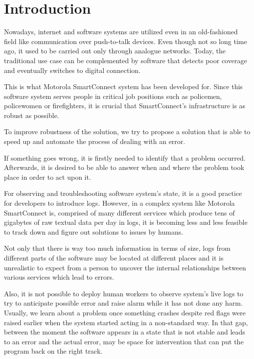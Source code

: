 
\chapter{Introduction}
\label{introduction}

Nowadays, internet and software systems are utilized even in an old-fashioned field like communication over push-to-talk devices. Even though not so long time ago, it used to be carried out only through analogue networks. Today, the traditional use case can be complemented by software that detects poor coverage and eventually switches to digital connection. 

This is what Motorola SmartConnect system has been developed for. 
Since this software system serves people in critical job positions such as policemen, policewomen or firefighters, it is crucial that SmartConnect's infrastructure is as robust as possible.

To improve robustness of the solution, we try to propose a solution that is able to speed up and automate the process of dealing with an error.

If something goes wrong, it is firstly needed to identify that a problem occurred. 
Afterwards, it is desired to be able to answer when and where the problem took place in order to act upon it.

For observing and troubleshooting software system's state, it is a good practice for developers to introduce logs.
However, in a complex system like Motorola SmartConnect is, comprised of many different services which produce tens of gigabytes of raw textual data per day in logs, it is becoming less and less feasible to track down and figure out solutions to issues by humans.

Not only that there is way too much information in terms of size, logs from different parts of the software may be located at different places and it is unrealistic to expect from a person to uncover the internal relationships between various services which lead to errors.

Also, it is not possible to deploy human workers to observe system's live logs to try to anticipate possible error and raise alarm while it has not done any harm. 
Usually, we learn about a problem once something crashes despite red flags were raised earlier when the system started acting in a non-standard way. In that gap, between the moment the software appears in a state that is not stable and leads to an error and the actual error, may be space for intervention that can put the program back on the right track.

